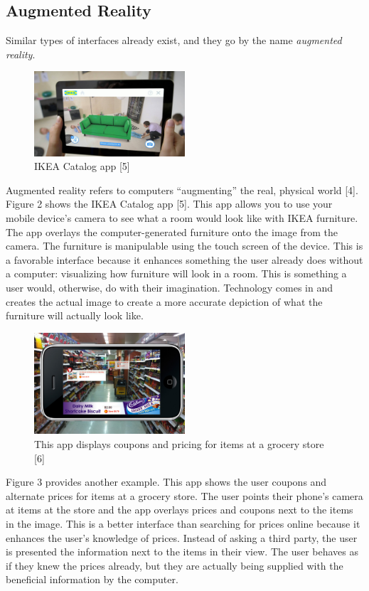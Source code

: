 \documentclass[a4paper,12pt]{article}
\begin{document}
\subsection{Augmented Reality}


Similar types of interfaces already exist, and they go by the name \emph{augmented reality}. 
\begin{figure}
\centering
\includegraphics[width=0.5\textwidth]{ikea}
\caption{IKEA Catalog app [5]}
\end{figure}


Augmented reality refers to computers ``augmenting'' the real, physical world [4]. Figure 2 shows the IKEA Catalog app [5]. This app allows you to use your mobile device's camera to see what a room would look like with IKEA furniture. The app overlays the computer-generated furniture onto the image from the camera. The furniture is manipulable using the touch screen of the device. This is a favorable interface because it enhances something the user already does without a computer: visualizing how furniture will look in a room. This is something a user would, otherwise, do with their imagination. Technology comes in and creates the actual image to create a more accurate depiction of what the furniture will actually look like.

\begin{figure}
\centering
\includegraphics[width=0.5\textwidth]{coupons}
\caption{This app displays coupons and pricing for items at a grocery store [6]}
\end{figure}

Figure 3 provides another example. This app shows the user coupons and alternate prices for items at a grocery store. The user points their phone's camera at items at the store and the app overlays prices and coupons next to the items in the image. This is a better interface than searching for prices online because it enhances the user's knowledge of prices. Instead of asking a third party, the user is presented the information next to the items in their view. The user behaves as if they knew the prices already, but they are actually being supplied with the beneficial information by the computer.
\end{document}
